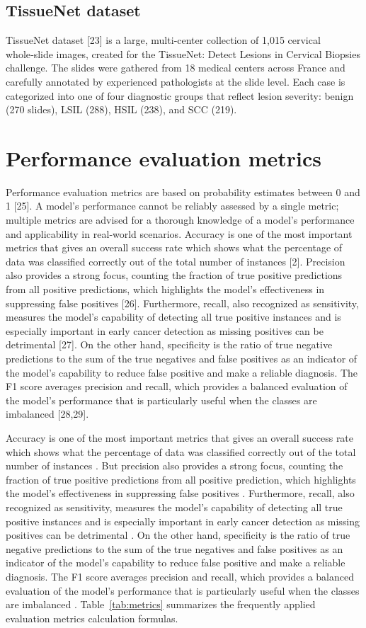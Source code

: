 \documentclass{svjour3}
\begin{document}
\subsection{TissueNet dataset}
TissueNet dataset [23] is a large, multi‑center collection of 1,015 cervical whole‑slide images, created for the TissueNet: Detect Lesions in Cervical Biopsies challenge. The slides were gathered from 18 medical centers across France and carefully annotated by experienced pathologists at the slide level. Each case is categorized into one of four diagnostic groups that reflect lesion severity: benign (270 slides), LSIL (288), HSIL (238), and SCC (219).
\section{Performance evaluation metrics}
Performance evaluation metrics are based on probability estimates between 0 and 1 [25]. A model’s performance cannot be reliably assessed by a single metric; multiple metrics are advised for a thorough knowledge of a model’s performance and applicability in real‑world scenarios.
Accuracy is one of the most important metrics that gives an overall success rate which shows what the percentage of data was classified correctly out of the total number of instances [2]. Precision also provides a strong focus, counting the fraction of true positive predictions from all positive predictions, which highlights the model’s effectiveness in suppressing false positives [26]. Furthermore, recall, also recognized as sensitivity, measures the model’s capability of detecting all true positive instances and is especially important in early cancer detection as missing positives can be detrimental [27]. On the other hand, specificity is the ratio of true negative predictions to the sum of the true negatives and false positives as an indicator of the model’s capability to reduce false positive and make a reliable diagnosis. The F1 score averages precision and recall, which provides a balanced evaluation of the model’s performance that is particularly useful when the classes are imbalanced [28,29].

Accuracy is one of the most important metrics that gives an overall success rate which shows what the percentage of data was classified correctly out of the total number of instances \cite{ref2}. But precision also provides a strong focus, counting the fraction of true positive predictions from all positive prediction, which highlights the model’s effectiveness in suppressing false positives \cite{ref26}. Furthermore, recall, also recognized as sensitivity, measures the model’s capability of detecting all true positive instances and is especially important in early cancer detection as missing positives can be detrimental \cite{ref27}. On the other hand, specificity is the ratio of true negative predictions to the sum of the true negatives and false positives as an indicator of the model’s capability to reduce false positive and make a reliable diagnosis. The F1 score averages precision and recall, which provides a balanced evaluation of the model’s performance that is particularly useful when the classes are imbalanced \cite{ref28,ref29}. Table~\ref{tab:metrics} summarizes the frequently applied evaluation metrics calculation formulas.
\end{document}
